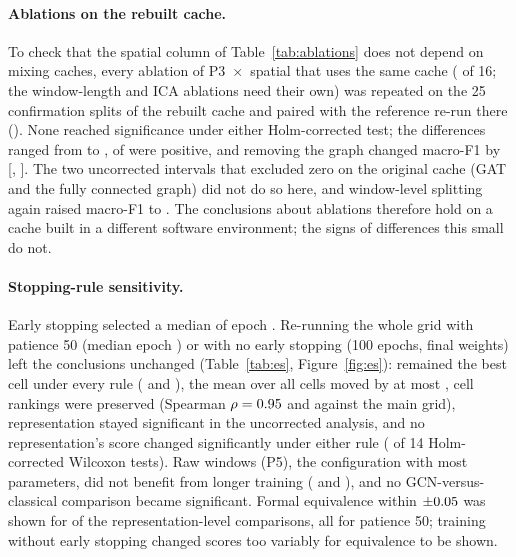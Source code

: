 \paragraph{Ablations on the rebuilt cache.} To check that the spatial column of Table~\ref{tab:ablations} does not depend on mixing caches, every ablation of P3~$\times$~spatial that uses the same cache (\rbN{} of 16; the window-length and ICA ablations need their own) was repeated on the 25 confirmation splits of the rebuilt cache and paired with the reference re-run there (\aTwoRefConfirmation{}). None reached significance under either Holm-corrected test; the differences ranged from \rbDeltaLo{} to \rbDeltaHi{}, \rbNPos{} of \rbN{} were positive, and removing the graph changed macro-F1 by \rbNoGraph{} [\rbNoGraphLo{}, \rbNoGraphHi{}]. The two uncorrected intervals that excluded zero on the original cache (GAT and the fully connected graph) did not do so here, and window-level splitting again raised macro-F1 to \rbLeaky{}. The conclusions about ablations therefore hold on a cache built in a different software environment; the signs of differences this small do not.

\paragraph{Stopping-rule sensitivity.} Early stopping selected a median of epoch \bestEpochMedian{}. Re-running the whole grid with patience
50 (median epoch \esPFiftyEpochMedian{}) or with no early stopping (100 epochs, final weights) left the
conclusions unchanged (Table~\ref{tab:es}, Figure~\ref{fig:es}): \bestCell{} remained the best cell
under every rule (\esPFiftyBestFOne{} and \esFixedBestFOne{}), the mean over all cells moved by at most
\esGrandShiftMax{}, cell rankings were preserved (Spearman $\rho=0.95$ and \esFixedRho{} against the main
grid), representation stayed significant in the uncorrected analysis, and no representation's score
changed significantly under
either rule (\esNSigWil{} of 14 Holm-corrected Wilcoxon tests). Raw windows (P5), the configuration
with most parameters, did not benefit from longer training (\esPFiftyPFiveDelta{} and
\esFixedPFiveDelta{}), and no GCN-versus-classical comparison became significant. Formal equivalence
within $\pm0.05$ was shown for \eqEsNEquiv{} of the \eqEsN{} representation-level comparisons, all
for patience 50; training without early stopping changed scores too variably for equivalence to be
shown.

